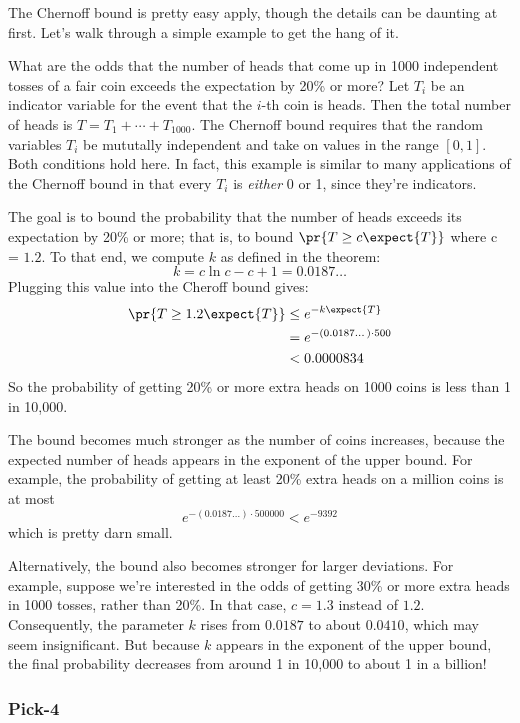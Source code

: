 The Chernoff bound is pretty easy apply, though the details can be
daunting at first.  Let's walk through a simple example to get the
hang of it.

What are the odds that the number of heads that come up in 1000
independent tosses of a fair coin exceeds the expectation by 20\% or
more?  Let $T_i$ be an indicator variable for the event that the
$i$-th coin is heads.  Then the total number of heads is $T = T_1 +
\cdots + T_{1000}$.  The Chernoff bound requires that the random
variables $T_i$ be mututally independent and take on values in the
range $[0, 1]$.  Both conditions hold here.  In fact, this example is
similar to many applications of the Chernoff bound in that every $T_i$
is {\em either} 0 or 1, since they're indicators.

The goal is to bound the probability that the number of heads exceeds
its expectation by 20\% or more; that is, to bound $\pr{T \geq c
  \expect{T}}$ where c = $1.2$.  To that end, we compute $k$ as
defined in the theorem:
\[
k = c \ln c - c + 1 = 0.0187\dots
\]
Plugging this value into the Cheroff bound gives:
\begin{align*}
\pr{T \geq 1.2 \expect{T}} & \leq  e^{- k \expect{T}} \\
  & = e^{- (0.0187\dots) \cdot 500} \\
  & <  0.0000834
\end{align*}
So the probability of getting 20\% or more extra heads on 1000 coins is
less than 1 in 10,000.

The bound becomes much stronger as the number of coins increases,
because the expected number of heads appears in the exponent of the
upper bound.  For example, the probability of getting at least 20\%
extra heads on a million coins is at most
\[
e^{- (0.0187\dots) \cdot 500000} < e^{-9392}
\]
which is pretty darn small.

Alternatively, the bound also becomes stronger for larger deviations.
For example, suppose we're interested in the odds of getting 30\% or
more extra heads in 1000 tosses, rather than 20\%.  In that case,
$c= 1.3$ instead of $1.2$.  Consequently, the parameter $k$ rises from
$0.0187$ to about $0.0410$, which may seem insignificant.  But because
$k$ appears in the exponent of the upper bound, the final probability
decreases from around 1 in 10,000 to about 1 in a billion!

\subsubsection{Pick-4}

